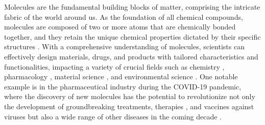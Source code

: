 \documentclass{article}
\theoremstyle{plain}
\theoremstyle{definition}
\theoremstyle{remark}
\begin{document}
Molecules are the fundamental building blocks of matter, comprising the intricate fabric of the world around us.
As the foundation of all chemical compounds, molecules are composed of two or more atoms that are chemically bonded together, and they retain the unique chemical properties dictated by their specific structures \cite{xu2023plasma}.
With a comprehensive understanding of molecules, scientists can effectively design materials, drugs, and products with tailored characteristics and functionalities, impacting a variety of crucial fields such as chemistry \cite{wang2023advances,cuzzucoli2023predictive,weng2021late}, pharmacology \cite{patani1996bioisosterism,anderson2003process,ding2019selective}, material science \cite{curtarolo2013high,higuchi2023material}, and environmental science \cite{ali2023new,lv2023autonomous}.
One notable example is in the pharmaceutical industry during the COVID-19 pandemic, where the discovery of new molecules has the potential to revolutionize not only the development of groundbreaking treatments, therapies \cite{gupta2023protein}, and vaccines against viruses but also a wide range of other diseases in the coming decade \cite{osamor2023covid}.
\end{document}
